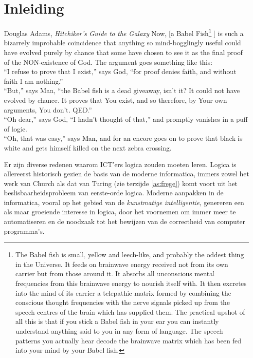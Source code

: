 \chapter{Inleiding}
\begin{chapquote}[30pt]{Douglas Adams, \textit{Hitchiker's Guide to the Galaxy}}
Now, [a Babel Fish\footnote{The Babel fish is small, yellow and leech-like, and probably the oddest thing in the Universe. It feeds on brainwave energy received not from its own carrier but from those around it. It absorbs all unconscious mental frequencies from this brainwave energy to nourish itself with. It then excretes into the mind of its carrier a telepathic matrix formed by combining the conscious thought frequencies with the nerve signals picked up from the speech centres of the brain which has supplied them. The practical upshot of all this is that if you stick a Babel fish in your ear you can instantly understand anything said to you in any form of language. The speech patterns you actually hear decode the brainwave matrix which has been fed into your mind by your Babel fish.\cite{adams}}%
] is such a bizarrely improbable coincidence that anything so mind-bogglingly useful could have evolved purely by chance that some have chosen to see it as the final proof of the NON-existence of God. The argument goes something like this:\\[2.5pt]
\enquote{I refuse to prove that I exist,} says God, \enquote{for proof denies faith, and without faith I am nothing.}\\[2.5pt]
\enquote{But,} says Man, \enquote{the Babel fish is a dead giveaway, isn't it? It could not have evolved by chance. It proves that You exist, and so therefore, by Your own arguments, You don't. QED.}\\[2.5pt]
\enquote{Oh dear,} says God, \enquote{I hadn't thought of that,} and promptly vanishes in a puff of logic.\\[2.5pt]
\enquote{Oh, that was easy,} says Man, and for an encore goes on to prove that black is white and gets himself killed on the next zebra crossing.
\end{chapquote}

Er zijn diverse redenen waarom ICT'ers logica zouden moeten leren. Logica is allereerst historisch gezien de basis van de moderne informatica, immers zowel het werk van Church als dat van Turing (zie terzijde \ref{as:frege}) komt voort uit het beslisbaarheidsprobleem van eerste-orde logica. Moderne aanpakken in de informatica, vooral op het gebied van de \emph{kunstmatige intelligentie}, genereren een als maar groeiende interesse in logica, door het voornemen om immer meer te automatiseren en de noodzaak tot het bewijzen van de correctheid van computer programma's. 

